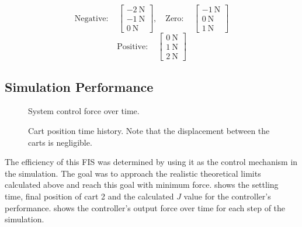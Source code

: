 	
\begin{displaymath}
    \mathrm{Negative:}\quad 
        \begin{bmatrix}
            \SI{-2}{\newton}\\
            \SI{-1}{\newton}\\
            \SI{0}{\newton}
        \end{bmatrix}, \quad
    \mathrm{Zero:}\quad 
        \begin{bmatrix}
            \SI{-1}{\newton}\\
            \SI{0}{\newton}\\
            \SI{1}{\newton}
        \end{bmatrix}
\end{displaymath}
\begin{displaymath}
    \mathrm{Positive:}
    \quad 
        \begin{bmatrix}
            \SI{0}{\newton}\\
            \SI{1}{\newton}\\
            \SI{2}{\newton}
        \end{bmatrix}
\end{displaymath}

\subsection{Simulation Performance}\label{ss:simperf}
\begin{figure}[ht]
    \centering
    
    \caption{System control force over time.}\label{f:forceplot}
\end{figure}

\begin{figure}
    \centering
    
    \caption{Cart position time history. Note that the displacement between the carts is negligible.}%
    \label{f:accresponse}
\end{figure}




The efficiency of this FIS was determined by using it as the control mechanism in the simulation. The goal was
to approach the realistic theoretical limits calculated above and reach this goal with minimum force.
 shows the settling time, final position of cart 2 and the calculated $J$ value for
the controller's performance.  shows the controller's output force over time for each
step of the simulation. 

